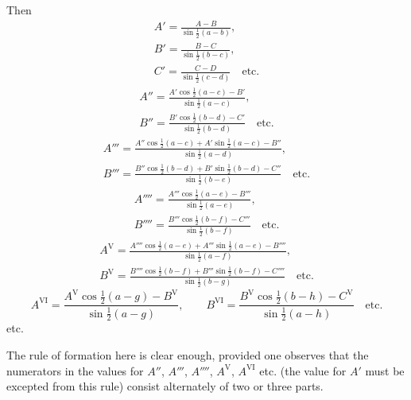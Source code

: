 Then
\[\begin{gathered}
A'=\frac{A-B}{\sin\tfrac12(a-b)},\\[5pt]
B'=\frac{B-C}{\sin\tfrac12(b-c)},\\[5pt]
C'=\frac{C-D}{\sin\tfrac12(c-d)}\quad\text{etc.}
\end{gathered}\]
\[\begin{gathered}
A''=\frac{A'\cos\tfrac12(a-c)-B'}{\sin\tfrac12(a-c)},\\[5pt]
B''=\frac{B'\cos\tfrac12(b-d)-C'}{\sin\tfrac12(b-d)}\quad\text{etc.}
\end{gathered}\]
\[\begin{gathered}
A'''=\frac{A''\cos\tfrac12(a-c)+A'\sin\tfrac12(a-c)-B''}{\sin\tfrac12(a-d)},\\[5pt]
B'''=\frac{B''\cos\tfrac12(b-d)+B'\sin\tfrac12(b-d)-C''}{\sin\tfrac12(b-e)}\quad\text{etc.}
\end{gathered}\]
\[\begin{gathered}
A''''=\frac{A'''\cos\tfrac12(a-e)-B'''}{\sin\tfrac12(a-e)},\\[5pt]
B''''=\frac{B'''\cos\tfrac12(b-f)-C'''}{\sin\tfrac12(b-f)}\quad\text{etc.}
\end{gathered}\]
\[\begin{gathered}
A^{\mathrm{V}}=\frac{A''''\cos\tfrac12(a-e)+A'''\sin\tfrac12(a-e)-B''''}{\sin\tfrac12(a-f)},\\[5pt]
B^{\mathrm{V}}=\frac{B''''\cos\tfrac12(b-f)+B'''\sin\tfrac12(b-f)-C''''}{\sin\tfrac12(b-g)}\quad\text{etc.}
\end{gathered}\]
\[
A^{\mathrm{VI}}=\frac{A^{\mathrm{V}}\cos\tfrac12(a-g)-B^{\mathrm{V}}}{\sin\tfrac12(a-g)},\qquad
B^{\mathrm{VI}}=\frac{B^{\mathrm{V}}\cos\tfrac12(b-h)-C^{\mathrm{V}}}{\sin\tfrac12(a-h)}\quad\text{etc.}
\]
etc.

The rule of formation here is clear enough, provided one observes that the numerators in the values for $A''$, $A'''$, $A''''$, $A^{\mathrm{V}}$, $A^{\mathrm{VI}}$ etc. (the value for $A'$ must be excepted from this rule) consist alternately of two or three parts.

\endgroup
